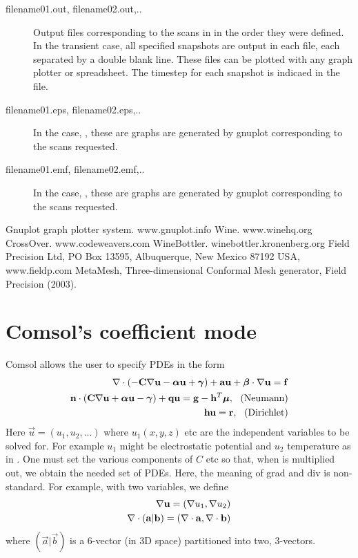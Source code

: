 \documentclass[a4paper,twoside,11pt]{book}
\begin{document}
\begin{description}
\item[filename01.out, filename02.out,..] Output files corresponding to
  the scans in  in the order they were defined. In
  the transient case, all specified snapshots are output in each file,
  each separated by a double blank line. These files can be plotted
  with any graph plotter or spreadsheet. The timestep for each
  snapshot is indicaed in the file.

\item[filename01.eps, filename02.eps,..] In the case,
  , these are graphs are generated by gnuplot
  corresponding to the scans requested.

\item[filename01.emf, filename02.emf,..] In the case,
  , these are graphs are generated by gnuplot
  corresponding to the scans requested.
\end{description}

\begin{thebibliography}{9}
   Gnuplot graph plotter system. www.gnuplot.info
   Wine. www.winehq.org
   CrossOver. www.codeweavers.com
   WineBottler. winebottler.kronenberg.org
   Field Precision Ltd, PO Box 13595, Albuquerque, New Mexico 87192 USA, www.fieldp.com
   MetaMesh, Three-dimensional Conformal Mesh generator, Field Precision (2003).
\end{thebibliography}

\appendix

\chapter{Comsol's coefficient mode}
\label{comcoef}

Comsol allows the user to specify PDEs in the form
\begin{eqnarray}
  \nabla\cdot (-\mathbf{C}\nabla \mathbf{u} -\mbox{\boldmath $\alpha$} \mathbf{u}+\mbox{\boldmath $\gamma$})+\mathbf{a}\mathbf{u}+\mbox{\boldmath $\beta$}\cdot\nabla \mathbf{u}
=\mathbf{f} \label{comeq}\\
  \mathbf{n}\cdot(\mathbf{C}\nabla\mathbf{u}+\mbox{\boldmath $\alpha$} \mathbf{u}-\mbox{\boldmath $\gamma$})+\mathbf{q}\mathbf{u}=\mathbf{g}-\mathbf{h}^T\mbox{\boldmath $\mu$},
~~ \mathrm{(Neumann)}\label{comneu}\\
  \mathbf{h}\mathbf{u}=\mathbf{r},~~ \mathrm{(Dirichlet)}
\end{eqnarray}
Here $\vec u=(u_1,u_2,...)$ where $u_1(x,y,z)$ etc are the independent
variables to be solved for. For example $u_1$ might be electrostatic
potential and $u_2$ temperature as in . One must set the
various components of $C$ etc so that, when  is multiplied
out, we obtain the needed set of PDEs. Here, the meaning of grad and
div is non-standard. For example, with two variables, we define
\begin{eqnarray}
  \nabla\mathbf{u} = (\nabla u_1,\nabla u_2)\\
  \nabla\cdot (\mathbf{a} | \mathbf{b})=(\nabla\cdot\mathbf{a}, \nabla\cdot\mathbf{b})
\end{eqnarray}
where $(\vec a | \vec b)$ is a 6-vector (in 3D space) partitioned into
two, 3-vectors.
\end{document}
